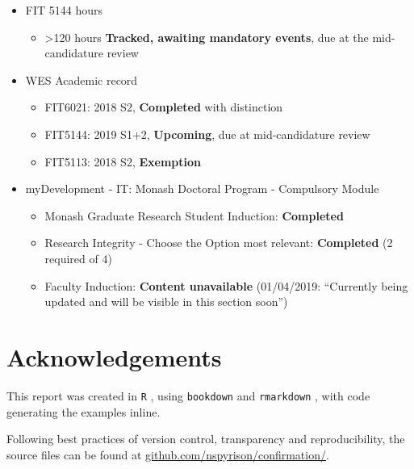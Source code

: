 \documentclass{monashthesis}
\begin{document}
\begin{itemize}
\tightlist
\item
  FIT 5144 hours

  \begin{itemize}
  \tightlist
  \item
    \textgreater120 hours \textbf{Tracked, awaiting mandatory events}, due at the mid-candidature review
  \end{itemize}
\item
  WES Academic record

  \begin{itemize}
  \tightlist
  \item
    FIT6021: 2018 S2, \textbf{Completed} with distinction
  \item
    FIT5144: 2019 S1+2, \textbf{Upcoming}, due at mid-candidature review
  \item
    FIT5113: 2018 S2, \textbf{Exemption}
  \end{itemize}
\item
  myDevelopment - IT: Monash Doctoral Program - Compulsory Module

  \begin{itemize}
  \tightlist
  \item
    Monash Graduate Research Student Induction: \textbf{Completed}
  \item
    Research Integrity - Choose the Option most relevant: \textbf{Completed} (2 required of 4)
  \item
    Faculty Induction: \textbf{Content unavailable} (01/04/2019: ``Currently being updated and will be visible in this section soon'')
  \end{itemize}
\end{itemize}

\hypertarget{sec:source}{%
\section{Acknowledgements}\label{sec:source}}

This report was created in \texttt{R} \autocite{r_core_team_r:_2018}, using \texttt{bookdown} \autocite{xie_bookdown:_2016} and \texttt{rmarkdown} \autocite{xie_r_2018}, with code generating the examples inline.

Following best practices of version control, transparency and reproducibility, the source files can be found at \href{https://github.com/nspyrison/Confirmation}{github.com/nspyrison/confirmation/}.

\appendix
\end{document}
